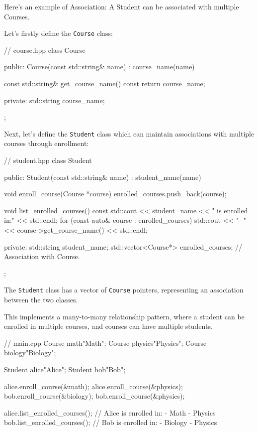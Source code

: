 \vspace{0.5em}

Here's an example of Association: A Student can be associated with multiple Courses.

Let's firstly define the \texttt{Course} class:

\begin{codeblock}[language=C++]
// course.hpp
class Course {
public:
    Course(const std::string& name) : course_name(name) {}

    const std::string& get_course_name() const {
        return course_name;
    }

private:
    std::string course_name;
};
\end{codeblock}

Next, let's define the \texttt{Student} class which can maintain associations with multiple courses through enrollment:

\begin{codeblock}[language=C++]
// student.hpp
class Student {
public:
    Student(const std::string& name) : student_name(name) {}

    void enroll_course(Course *course) {
        enrolled_courses.push_back(course);
    }

    void list_enrolled_courses() const {
        std::cout << student_name << " is enrolled in:" << std::endl;
        for (const auto& course : enrolled_courses) {
            std::cout << "- " << course->get_course_name() << std::endl;
        }
    }

private:
    std::string student_name;
    std::vector<Course*> enrolled_courses; // Association with Course.
};
\end{codeblock}

The \texttt{Student} class has a vector of \texttt{Course} pointers, representing an association between the two classes.

This implements a many-to-many relationship pattern, where a student can be enrolled in multiple courses, and courses can have multiple students.

\vspace{-0.5em}

\begin{codeblock}[language=C++]
// main.cpp
Course math{"Math"};
Course physics{"Physics"};
Course biology{"Biology"};

Student alice{"Alice"};
Student bob{"Bob"};

alice.enroll_course(&math);
alice.enroll_course(&physics);
bob.enroll_course(&biology);
bob.enroll_course(&physics);

alice.list_enrolled_courses(); // Alice is enrolled in: - Math - Physics
bob.list_enrolled_courses(); // Bob is enrolled in: - Biology - Physics
\end{codeblock}

